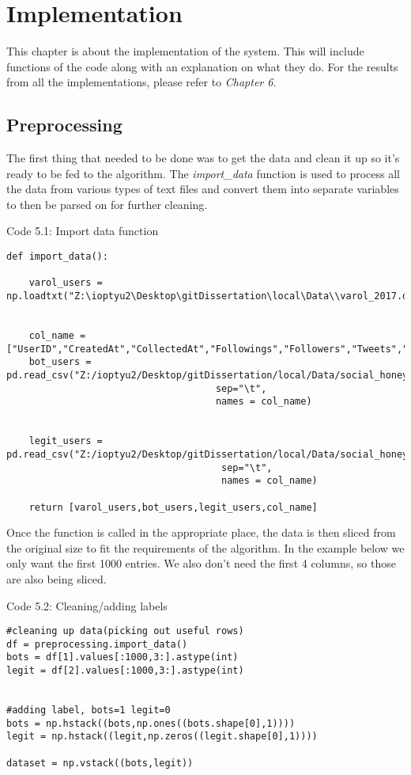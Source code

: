 

\chapter{Implementation}

\label{Chapter5}

This chapter is about the implementation of the system. This will include functions of the code along with an explanation on what they do. For the results from all the implementations, please refer to \textit{Chapter 6}.

\section{Preprocessing}

The first thing that needed to be done was to get the data and clean it up so it's ready to be fed to the algorithm. The \textit{import\_data} function is used to process all the data from various types of text files and convert them into separate variables to then be parsed on for further cleaning. 
\begin{center} 
Code 5.1: Import data function
\end{center}
\begin{lstlisting}
def import_data():

    varol_users = np.loadtxt("Z:\ioptyu2\Desktop\gitDissertation\local\Data\\varol_2017.dat")


    col_name = ["UserID","CreatedAt","CollectedAt","Followings","Followers","Tweets","NameLength","BioLength"]
    bot_users = pd.read_csv("Z:/ioptyu2/Desktop/gitDissertation/local/Data/social_honeypot_icwsm_2011/content_polluters.txt",
                                     sep="\t",
                                     names = col_name)


    legit_users = pd.read_csv("Z:/ioptyu2/Desktop/gitDissertation/local/Data/social_honeypot_icwsm_2011/legitimate_users.txt",
                                      sep="\t",
                                      names = col_name)
    
    return [varol_users,bot_users,legit_users,col_name]
\end{lstlisting}

Once the function is called in the appropriate place, the data is then sliced from the original size to fit the requirements of the algorithm. In the example below we only want the first 1000 entries. We also don't need the first 4 columns, so those are also being sliced. 
\begin{center} 
Code 5.2: Cleaning/adding labels
\end{center}
\begin{lstlisting}
#cleaning up data(picking out useful rows)
df = preprocessing.import_data()
bots = df[1].values[:1000,3:].astype(int)
legit = df[2].values[:1000,3:].astype(int)


#adding label, bots=1 legit=0
bots = np.hstack((bots,np.ones((bots.shape[0],1))))
legit = np.hstack((legit,np.zeros((legit.shape[0],1))))

dataset = np.vstack((bots,legit))
\end{lstlisting}


